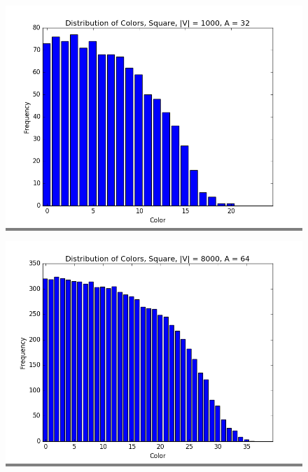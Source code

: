 \documentclass{article}
\begin{document}
\begin{figure}
    \begin{minipage}{0.3\textwidth}
    \colorbox{gray}{\includegraphics[width=\linewidth]{./graphs/hist_colors_square_0.png}}
    \end{minipage}
    \hspace{\fill}
    \begin{minipage}{0.3\textwidth}
    \colorbox{gray}{\includegraphics[width=\linewidth]{./graphs/hist_colors_square_1.png}}
    \end{minipage}
    \hspace{\fill}
    \begin{minipage}{0.3\textwidth}

\end{minipage}
\end{figure}
\end{document}
